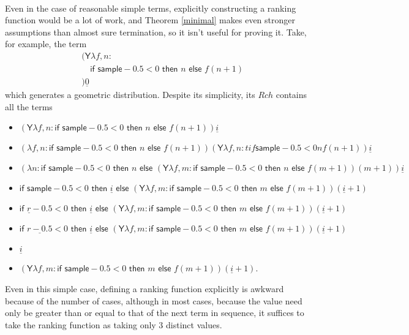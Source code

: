 \documentclass{article}
\newcommand{\tY}{\textsf{Y}}
\newcommand{\tif}[3]{\textsf{if }#1\textsf{ then }#2\textsf{ else }#3}
\newcommand{\tsample}{\textsf{sample}}
\begin{document}
\paragraph{}
Even in the case of reasonable simple terms, explicitly constructing a ranking function would be a lot of work, and Theorem \ref{minimal} makes even stronger assumptions than almost sure termination, so it isn't useful for proving it. Take, for example, the term
\begin{align*}
&(\tY \lambda f, n: \\
&\quad \tif{\tsample - 0.5 < 0}{n}{f (n+1)} \\
&) \underline{0}
\end{align*}
which generates a geometric distribution.
    Despite its simplicity, its $Rch$ contains all the terms
\begin{itemize}
    \item $(\tY \lambda f, n: \tif{\tsample - 0.5 < 0}{n}{f (n+1)}) \underline{i}$
    \item $(\lambda f, n: \tif{\tsample - 0.5 < 0}{n}{f (n+1)}) (\tY \lambda f, n: tif{\tsample - 0.5 < 0}{n}{f (n+1)}) \underline{i}$
    \item $(\lambda n: \tif{\tsample - 0.5 < 0}{n}{(\tY \lambda f, m: \tif{\tsample - 0.5 < 0}{n}{f (m+1)}) (m+1)}) \underline{i}$
    \item $\tif{\tsample - 0.5 < 0}{\underline{i}}{(\tY \lambda f, m: \tif{\tsample - 0.5 < 0}{m}{f (m+1)}) (\underline{i}+1)}$
    \item $\tif{\underline r - 0.5 < 0}{\underline{i}}{(\tY \lambda f, m: \tif{\tsample - 0.5 < 0}{m}{f (m+1)}) (\underline{i}+1)}$
    \item $\tif{\underline{r-0.5} < 0}{\underline{i}}{(\tY \lambda f, m: \tif{\tsample - 0.5 < 0}{m}{f (m+1)}) (\underline{i}+1)}$
    \item $\underline{i}$
    \item $(\tY \lambda f, m: \tif{\tsample - 0.5 < 0}{m}{f (m+1)}) (\underline{i}+1)$.
\end{itemize}
Even in this simple case, defining a ranking function explicitly is awkward because of the number of cases, although in most cases, because the value need only be greater than or equal to that of the next term in sequence, it suffices to take the ranking function as taking only 3 distinct values.
\end{document}
